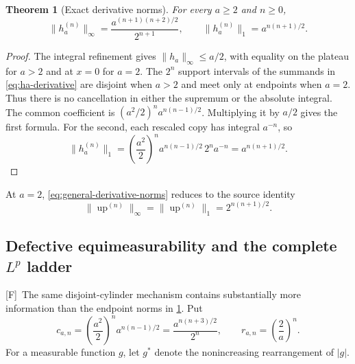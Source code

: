 \documentclass[11pt,oneside]{article}
\newtheorem{theorem}{Theorem}[section]
\theoremstyle{definition}
\theoremstyle{remark}
\newcommand{\Up}{\operatorname{up}}
\newcommand{\Fmark}{\textcolor{frontierpurple}{\textsf{[F]}}}
\begin{document}
\begin{theorem}[Exact derivative norms]
\label{thm:derivative-norms}
For every $a\ge2$ and $n\ge0$,
\begin{equation}
 \boxed{\quad
 \|h_a^{(n)}\|_{\infty}
 =\frac{a^{(n+1)(n+2)/2}}{2^{n+1}},
 \qquad
 \|h_a^{(n)}\|_{1}=a^{n(n+1)/2}.
 \quad}
 \label{eq:general-derivative-norms}
\end{equation}
\end{theorem}

\begin{proof}
The integral refinement gives $\|h_a\|_\infty\le a/2$, with equality on the plateau for
$a>2$ and at $x=0$ for $a=2$.  The $2^n$ support intervals of the summands in
\eqref{eq:ha-derivative} are disjoint when $a>2$ and meet only at endpoints when $a=2$.
Thus there is no cancellation in either the supremum or the absolute integral.  The common
coefficient is $(a^2/2)^n a^{n(n-1)/2}$.  Multiplying it by $a/2$ gives the first formula.
For the second, each rescaled copy has integral $a^{-n}$, so
\[
 \|h_a^{(n)}\|_1=
 \left(\frac{a^2}{2}\right)^n a^{n(n-1)/2}\,2^n a^{-n}
 =a^{n(n+1)/2}.
\]
\end{proof}

At $a=2$, \eqref{eq:general-derivative-norms} reduces to the source identity
\begin{equation}
 \|\Up^{(n)}\|_\infty=\|\Up^{(n)}\|_1=2^{n(n+1)/2}.
 \tag{S3.64}
\end{equation}

\subsection{Defective equimeasurability and the complete $L^p$ ladder}
\label{sec:defective-equimeasurability}

\Fmark\ The same disjoint-cylinder mechanism contains substantially more information than the
endpoint norms in \cref{thm:derivative-norms}.  Put
\begin{equation}
 c_{a,n}=\left(\frac{a^2}{2}\right)^n a^{n(n-1)/2}
          =\frac{a^{n(n+3)/2}}{2^n},
 \qquad r_{a,n}=\left(\frac2a\right)^n.
 \label{eq:can-ran}
\end{equation}
For a measurable function $g$, let $g^*$ denote the nonincreasing rearrangement of $|g|$.
\end{document}
